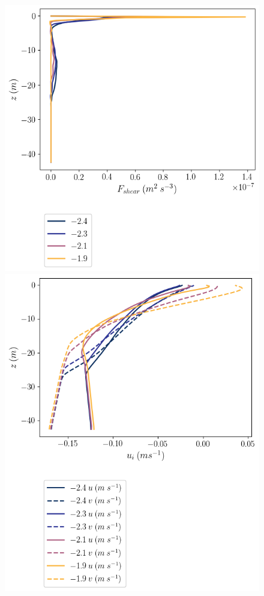 \documentclass[draft]{styles/agujournal2019}
\begin{document}
\begin{figure}
\begin{minipage}{0.5\textwidth}
        \includegraphics[trim={0 7.5cm 0 0},clip, width=\textwidth]{Figures/Fshear_cmp_dT_40hr_tav1_z_profile.png}
    \end{minipage}
    \newline
    \begin{minipage}{0.5\textwidth}
        \includegraphics[trim={0 7.5cm 0 0},clip, width=\textwidth]{Figures/velocity_cmp_dT_48hr_tav1_z_profile.png}

\end{minipage}
\end{figure}
\end{document}
